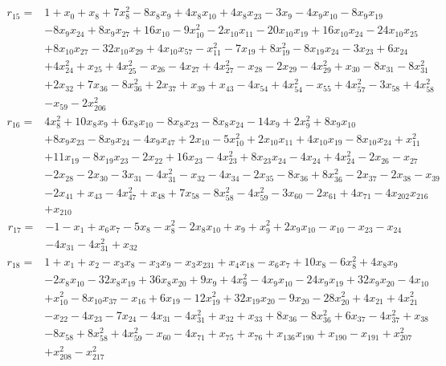 \[\begin{aligned}
r_{15}={}&1+x_{0}+x_{8}+7x_{8}^{2}-8x_{8}x_{9}+4x_{8}x_{10}+4x_{8}x_{23}-3x_{9}-4x_{9}x_{10}-8x_{9}x_{19}
\\ &-8x_{9}x_{24}+8x_{9}x_{27}+16x_{10}-9x_{10}^{2}-2x_{10}x_{11}-20x_{10}x_{19}+16x_{10}x_{24}-24x_{10}x_{25}
\\ &+8x_{10}x_{27}-32x_{10}x_{29}+4x_{10}x_{57}-x_{11}^{2}-7x_{19}+8x_{19}^{2}-8x_{19}x_{24}-3x_{23}+6x_{24}
\\ &+4x_{24}^{2}+x_{25}+4x_{25}^{2}-x_{26}-4x_{27}+4x_{27}^{2}-x_{28}-2x_{29}-4x_{29}^{2}+x_{30}-8x_{31}-8x_{31}^{2}
\\ &+2x_{32}+7x_{36}-8x_{36}^{2}+2x_{37}+x_{39}+x_{43}-4x_{54}+4x_{54}^{2}-x_{55}+4x_{57}^{2}-3x_{58}+4x_{58}^{2}
\\ &-x_{59}-2x_{206}^{2}
\end{aligned}\]
\[\begin{aligned}
r_{16}={}&4x_{8}^{2}+10x_{8}x_{9}+6x_{8}x_{10}-8x_{8}x_{23}-8x_{8}x_{24}-14x_{9}+2x_{9}^{2}+8x_{9}x_{10}
\\ &+8x_{9}x_{23}-8x_{9}x_{24}-4x_{9}x_{47}+2x_{10}-5x_{10}^{2}+2x_{10}x_{11}+4x_{10}x_{19}-8x_{10}x_{24}+x_{11}^{2}
\\ &+11x_{19}-8x_{19}x_{23}-2x_{22}+16x_{23}-4x_{23}^{2}+8x_{23}x_{24}-4x_{24}+4x_{24}^{2}-2x_{26}-x_{27}
\\ &-2x_{28}-2x_{30}-3x_{31}-4x_{31}^{2}-x_{32}-4x_{34}-2x_{35}-8x_{36}+8x_{36}^{2}-2x_{37}-2x_{38}-x_{39}
\\ &-2x_{41}+x_{43}-4x_{47}^{2}+x_{48}+7x_{58}-8x_{58}^{2}-4x_{59}^{2}-3x_{60}-2x_{61}+4x_{71}-4x_{202}x_{216}
\\ &+x_{210}
\end{aligned}\]
\[\begin{aligned}
r_{17}={}&-1-x_{1}+x_{6}x_{7}-5x_{8}-x_{8}^{2}-2x_{8}x_{10}+x_{9}+x_{9}^{2}+2x_{9}x_{10}-x_{10}-x_{23}-x_{24}
\\ &-4x_{31}-4x_{31}^{2}+x_{32}
\end{aligned}\]
\[\begin{aligned}
r_{18}={}&1+x_{1}+x_{2}-x_{3}x_{8}-x_{3}x_{9}-x_{3}x_{231}+x_{4}x_{18}-x_{6}x_{7}+10x_{8}-6x_{8}^{2}+4x_{8}x_{9}
\\ &-2x_{8}x_{10}-32x_{8}x_{19}+36x_{8}x_{20}+9x_{9}+4x_{9}^{2}-4x_{9}x_{10}-24x_{9}x_{19}+32x_{9}x_{20}-4x_{10}
\\ &+x_{10}^{2}-8x_{10}x_{37}-x_{16}+6x_{19}-12x_{19}^{2}+32x_{19}x_{20}-9x_{20}-28x_{20}^{2}+4x_{21}+4x_{21}^{2}
\\ &-x_{22}-4x_{23}-7x_{24}-4x_{31}-4x_{31}^{2}+x_{32}+x_{33}+8x_{36}-8x_{36}^{2}+6x_{37}-4x_{37}^{2}+x_{38}
\\ &-8x_{58}+8x_{58}^{2}+4x_{59}^{2}-x_{60}-4x_{71}+x_{75}+x_{76}+x_{136}x_{190}+x_{190}-x_{191}+x_{207}^{2}
\\ &+x_{208}^{2}-x_{217}^{2}
\end{aligned}\]
